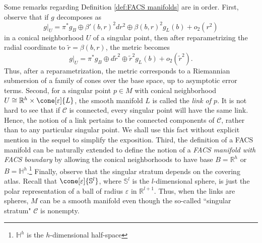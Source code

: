 \documentclass[12pt, reqno]{amsart}
\theoremstyle{plain} %
\theoremstyle{definition}
\theoremstyle{remark}
\numberwithin{equation}{section}
\newcommand{\cat}[1]{\mathcal{#1}}
\newcommand{\field}[1]{\mathbb{#1}}
\newcommand{\R}{\field{R}}
\newcommand{\sphe}{\mathbb{S}}
\newcommand{\hdim}{h} %
\newcommand{\ldim}{l} %
\begin{document}
Some remarks regarding Definition \ref{def:FACS manifolds} are in order.
First, observe that if \(g\) decomposes as
\begin{equation*}
    g|_U = \pi^*g_B \oplus \beta'(b,r)^2 dr^2 \oplus \beta(b,r)^2 g_L(b) + o_2(r^2)
\end{equation*}
in a conical neighborhood \(U\) of a singular point, then after reparametrizing the radial coordinate to \(\tilde{r} = \beta(b,r)\), the metric becomes
\begin{equation*}
    g|_U = \pi^*g_B \oplus d\tilde{r}^2 \oplus \tilde{r}^2 g_L(b) + o_2(\tilde{r}^2).
\end{equation*}
Thus, after a reparametrization, the metric corresponds to a Riemannian submersion of a family of cones over the base space, up to asymptotic error terms.
Second, for a singular point \(p \in M\) with conical neighborhood \(U \cong \R^\hdim \times \cone[\varepsilon]{L}\), the smooth manifold \(L\) is called the \textit{link of \(p\)}.
It is not hard to see that if \(\mathcal{C}\) is connected, every singular point will have the same link.
Hence, the notion of a link pertains to the connected components of \(\mathcal{C}\), rather than to any particular singular point.
We shall use this fact without explicit mention in the sequel to simplify the exposition.
Third, the definition of a FACS manifold can be naturally extended to define the notion of a \textit{FACS manifold with FACS boundary} by allowing the conical neighborhoods to have base \(B = \R^\hdim\) or \(B = \mathbb{H}^\hdim\).\footnote{\(\mathbb{H}^\hdim\) is the \(\hdim\)-dimensional half-space}
Finally, observe that the singular stratum depends on the covering atlas.
Recall that \(\cone[\varepsilon]{\sphe^\ldim}\), where \(\sphe^\ldim\) is the \(l\)-dimensional sphere, is just the polar representation of a ball of radius \(\varepsilon\) in \(\R^{\ldim+1}\).
Thus, when the links are spheres, \(M\) can be a smooth manifold even though the so-called ``singular stratum" \(\cat{C}\) is nonempty.
\end{document}
